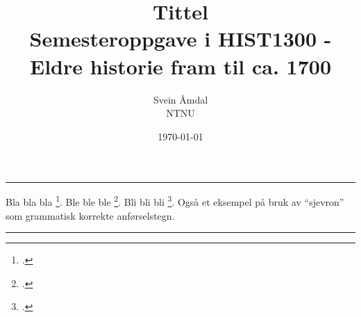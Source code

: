 \documentclass[12pt, a4paper, norsk]{article}
\title{\huge{\textbf{Tittel}}\\ \large{Semesteroppgave i HIST1300 - Eldre historie fram til ca. 1700}}
\author{\huge{Svein Åmdal} \\ \large{NTNU}}
\date{\today} %
\begin{document}
\maketitle
\hrule
\vspace{1cm}
\thispagestyle{empty}
\clearpage
\setcounter{page}{1}

Bla bla bla \footcite{Pounds}. Ble ble ble \footcite[27--30]{Ødegård}. Bli bli bli \footcites[4,22-23,45]{Wiesner-Hanks}[20]{Ødegård}. Også et eksempel på bruk av \enquote{sjevron} som grammatisk korrekte anførselstegn.


% 

\lipsum[1-2]





\vspace{1cm}
\hrule
\printbibliography[title=Litteratur]
\end{document}
